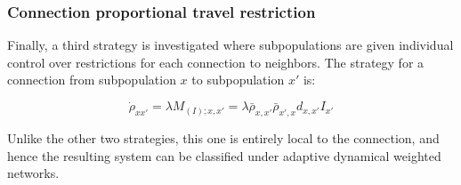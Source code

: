 \subsubsection{Connection proportional travel restriction}

Finally, a third strategy is investigated where subpopulations are given individual control over restrictions for each connection to neighbors. The strategy for a connection from subpopulation $x$ to subpopulation $x'$ is:

\begin{equation}
\dot{\rho}_{xx'} = \lambda M_{(I);x,x'} = \lambda \bar{\rho}_{x,x'} \bar{\rho}_{x',x} d_{x,x'} I_{x'}
\end{equation}

Unlike the other two strategies, this one is entirely local to the connection, and hence the resulting system can be classified under adaptive dynamical weighted networks\cite{berner2023adaptive}.\\

